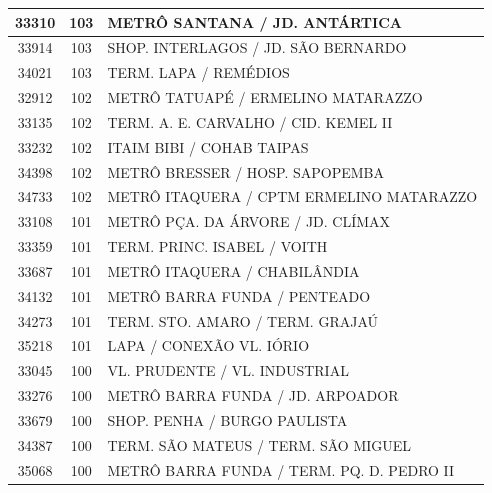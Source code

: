 \documentclass[
	12pt,				%
	oneside,			%
	a4paper,			%
	english,			%
	brazil				%
	]{abntex2ppgsi}
\begin{document}
\begin{apendicesenv}
\begin{longtable}{c|c|p{7cm}}
    33310 & 103   & METRÔ SANTANA / JD. ANTÁRTICA \\
\hline

    33914 & 103   & SHOP. INTERLAGOS / JD. SÃO BERNARDO \\
\hline

    34021 & 103   & TERM. LAPA / REMÉDIOS \\
\hline

    32912 & 102   & METRÔ TATUAPÉ / ERMELINO MATARAZZO \\
\hline

    33135 & 102   & TERM. A. E. CARVALHO / CID. KEMEL II \\
\hline

    33232 & 102   & ITAIM BIBI / COHAB TAIPAS \\
\hline

    34398 & 102   & METRÔ BRESSER / HOSP. SAPOPEMBA \\
\hline

    34733 & 102   & METRÔ ITAQUERA / CPTM ERMELINO MATARAZZO \\
\hline

    33108 & 101   & METRÔ PÇA. DA ÁRVORE / JD. CLÍMAX \\
\hline

    33359 & 101   & TERM. PRINC. ISABEL / VOITH \\
\hline

    33687 & 101   & METRÔ ITAQUERA / CHABILÂNDIA \\
\hline

    34132 & 101   & METRÔ BARRA FUNDA / PENTEADO \\
\hline

    34273 & 101   & TERM. STO. AMARO / TERM. GRAJAÚ \\
\hline

    35218 & 101   & LAPA / CONEXÃO VL. IÓRIO \\
\hline

    33045 & 100   & VL. PRUDENTE / VL. INDUSTRIAL \\
\hline

    33276 & 100   & METRÔ BARRA FUNDA / JD. ARPOADOR \\
\hline

    33679 & 100   & SHOP. PENHA / BURGO PAULISTA \\
\hline

    34387 & 100   & TERM. SÃO MATEUS / TERM. SÃO MIGUEL \\
\hline

    35068 & 100   & METRÔ BARRA FUNDA / TERM. PQ. D. PEDRO II \\
\hline


\end{longtable}
\end{apendicesenv}
\end{document}
